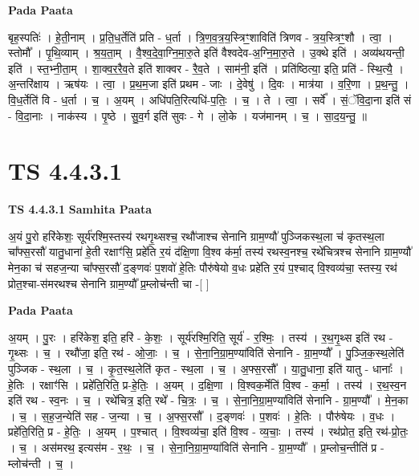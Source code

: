 \documentclass[17pt]{extarticle}
\begin{document}
\textbf{Pada Paata} \newline

बृह॒स्पतिः॑ । हे॒ती॒नाम् । प्र॒ति॒ध॒र्तेति॑ प्रति - ध॒र्ता । त्रि॒ण॒व॒त्र॒य॒स्त्रिꣳ॒॒शाविति॑ त्रिणव - त्र॒य॒स्त्रिꣳ॒॒शौ । त्वा॒ । स्तोमौ᳚ । पृ॒थि॒व्याम् । श्र॒य॒ता॒म् । वै॒श्व॒दे॒वा॒ग्नि॒मा॒रु॒ते इति॑ वैश्वदेव-अ॒ग्नि॒मा॒रु॒ते । उ॒क्थे इति॑ । अव्य॑थयन्ती॒ इति॑ । स्त॒भ्नी॒ता॒म् । शा॒क्व॒र॒रै॒व॒ते इति॑ शाक्वर - रै॒व॒ते । साम॑नी॒ इति॑ । प्रति॑ष्ठित्या॒ इति॒ प्रति॑ - स्थि॒त्यै॒ । अ॒न्तरि॑क्षाय । ऋष॑यः । त्वा॒ । प्र॒थ॒म॒जा इति॑ प्रथम - जाः । दे॒वेषु॑ । दि॒वः । मात्र॑या । व॒रि॒णा । प्र॒थ॒न्तु॒ । वि॒ध॒र्तेति॑ वि - ध॒र्ता । च॒ । अ॒यम् । अधि॑पति॒रित्यधि॑-प॒तिः॒ । च॒ । ते । त्वा॒ । सर्वे᳚ । सं॒ॅवि॒दा॒ना इति॑ सं - वि॒दा॒नाः । नाक॑स्य । पृ॒ष्ठे । सु॒व॒र्ग इति॑ सुवः - गे । लो॒के । यज॑मानम् । च॒ । सा॒द॒य॒न्तु॒ ॥  \newline




\section*{ TS 4.4.3.1 }

\textbf{TS 4.4.3.1 } \newline
\textbf{Samhita Paata} \newline

अ॒यं पु॒रो हरि॑केशः॒ सूर्य॑रश्मि॒स्तस्य॑ रथगृ॒थ्सश्च॒ रथौ॑जाश्च सेनानि ग्राम॒ण्यौ॑ पुञ्जिकस्थ॒ला च॑ कृतस्थ॒ला चा᳚फ्स॒रसौ॑ यातु॒धाना॑ हे॒ती रक्षाꣳ॑सि॒ प्रहे॑ति र॒यं द॑क्षि॒णा वि॒श्व क॑र्मा॒ तस्य॑ रथस्व॒नश्च॒ रथे॑चित्रश्च सेनानि ग्राम॒ण्यौ॑ मेन॒का च॑ सहज॒न्या चा᳚फ्स॒रसौ॑ द॒ङ्णवः॑ प॒शवो॑ हे॒तिः पौरु॑षेयो व॒धः प्रहे॑ति र॒यं प॒श्चाद् वि॒श्वव्य॑चा॒ स्तस्य॒ रथ॑ प्रोत॒श्चा-स॑मरथश्च सेनानि ग्राम॒ण्यौ᳚ प्र॒म्लोच॑न्ती चा -[  ] \newline

\textbf{Pada Paata} \newline

अ॒यम् । पु॒रः । हरि॑केश॒ इति॒ हरि॑ - के॒शः॒ । सूर्य॑रश्मि॒रिति॒ सूर्य॑ - र॒श्मिः॒ । तस्य॑ । र॒थ॒गृ॒थ्स इति॑ रथ - गृ॒थ्सः । च॒ । रथौ॑जा॒ इति॒ रथ॑ - ओ॒जाः॒ । च॒ । से॒ना॒नि॒ग्रा॒म॒ण्या॑विति॑ सेनानि - ग्रा॒म॒ण्यौ᳚ । पु॒ञ्जि॒क॒स्थ॒लेति॑ पुञ्जिक - स्थ॒ला । च॒ । कृ॒त॒स्थ॒लेति॑ कृत - स्थ॒ला । च॒ । अ॒फ्स॒रसौ᳚ । या॒तु॒धाना॒ इति॑ यातु - धानाः᳚ । हे॒तिः । रक्षाꣳ॑सि । प्रहे॑ति॒रिति॒ प्र-हे॒तिः॒ । अ॒यम् । द॒क्षि॒णा । वि॒श्वक॒र्मेति॑ वि॒श्व - क॒र्मा॒ । तस्य॑ । र॒थ॒स्व॒न इति॑ रथ - स्व॒नः । च॒ । रथे॑चित्र॒ इति॒ रथे᳚ - चि॒त्रः॒ । च॒ । से॒ना॒नि॒ग्रा॒म॒ण्या॑विति॑ सेनानि - ग्रा॒म॒ण्यौ᳚ । मे॒न॒का । च॒ । स॒ह॒ज॒न्येति॑ सह - ज॒न्या । च॒ । अ॒फ्स॒रसौ᳚ । द॒ङ्णवः॑ । प॒शवः॑ । हे॒तिः । पौरु॑षेयः । व॒धः । प्रहे॑ति॒रिति॒ प्र - हे॒तिः॒ । अ॒यम् । प॒श्चात् । वि॒श्वव्य॑चा॒ इति॑ वि॒श्व - व्य॒चाः॒ । तस्य॑ । रथ॑प्रोत॒ इति॒ रथ॑-प्रो॒तः॒ । च॒ । अस॑मरथ॒ इत्यस॑म - र॒थः॒ । च॒ । से॒ना॒नि॒ग्रा॒म॒ण्या॑विति॑ सेनानि - ग्रा॒म॒ण्यौ᳚ । प्र॒म्लोच॒न्तीति॑ प्र - म्लोच॑न्ती । च॒ ।  \newline
\end{document}

